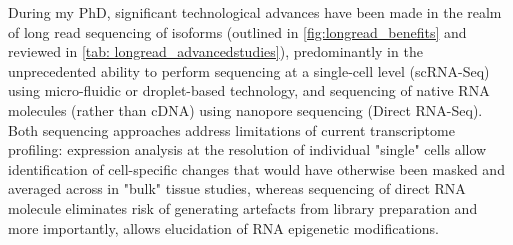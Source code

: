

During my PhD, significant technological advances have been made in the realm of long read sequencing of isoforms (outlined in \cref{fig:longread_benefits} and reviewed in \cref{tab: longread_advancedstudies}), predominantly in the unprecedented ability to perform sequencing at a single-cell level (scRNA-Seq) using micro-fluidic or droplet-based technology, and sequencing of native RNA molecules (rather than cDNA) using nanopore sequencing (Direct RNA-Seq). Both sequencing approaches address limitations of current transcriptome profiling: expression analysis at the resolution of individual "single" cells allow identification of cell-specific changes that would have otherwise been masked and averaged across in "bulk" tissue studies, whereas sequencing of direct RNA molecule eliminates risk of generating artefacts from library preparation and more importantly, allows elucidation of RNA epigenetic modifications.   



